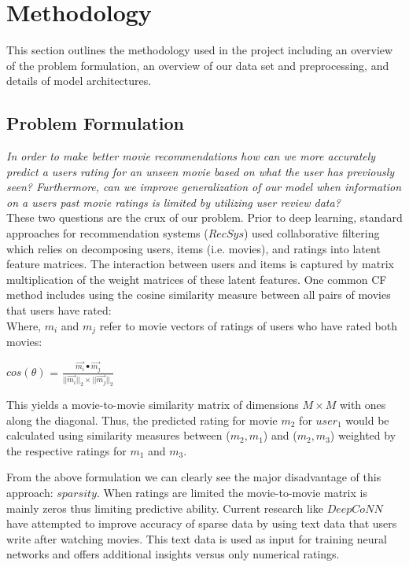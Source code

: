 \documentclass[10pt,twocolumn,letterpaper]{article}
\begin{document}
\section{Methodology}
This section outlines the methodology used in the project including an overview of the problem formulation, an overview of our data set and preprocessing, and details of model architectures.

\subsection{Problem Formulation}

\textit{In order to make better movie recommendations how can we more accurately predict a users rating for an unseen movie based on what the user has previously seen? Furthermore, can we improve generalization of our model when information on a users past movie ratings is limited by utilizing user review data?}\\

These two questions are the crux of our problem. Prior to deep learning, standard approaches for recommendation systems ($RecSys$) used collaborative filtering which relies on decomposing users, items (i.e. movies), and ratings into latent feature matrices. The interaction between users and items is captured by matrix multiplication of the weight matrices of these latent features. One common CF method includes using the cosine similarity measure between all pairs of movies that users have rated:\\

Where,
$m_{i}$ and $m_{j}$ refer to movie vectors of ratings of users who have rated both movies:

\begin{center}
\textbf{$cos(\theta)$} =
$\frac{\vec{m_{i}} \bullet \vec{m_{j}}}{||\vec{m_{i}}||_2 \times ||\vec{m_{j}}||_2}$
\end{center}

This yields a movie-to-movie similarity matrix of dimensions $M \times M$ with ones along the diagonal. Thus, the predicted rating for movie $m_{2}$ for $user_1$ would be calculated using similarity measures between ($m_2,m_1$) and ($m_2,m_3$) weighted by the respective ratings for $m_1$ and $m_3$. 

From the above formulation we can clearly see the major disadvantage of this approach: $sparsity$. When ratings are limited the movie-to-movie matrix is mainly zeros thus limiting predictive ability. Current research like $DeepCoNN$ have attempted to improve accuracy of sparse data by using text data that users write after watching movies. This text data is used as input for training neural networks and offers additional insights versus only numerical ratings.
\end{document}
